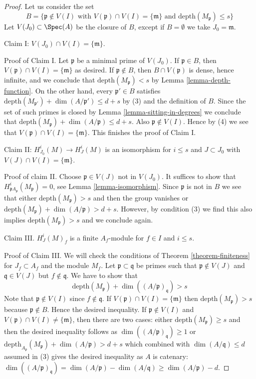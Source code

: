\begin{proof}
Let us consider the set
$$
B = \{\mathfrak p \not \in V(I) \text{ with }
V(\mathfrak p) \cap V(I) = \{\mathfrak m\} \text{ and }
\text{depth}(M_\mathfrak p) \leq s\}
$$
Let $V(J_0) \subset \Spec(A)$ be the closure of $B$, except
if $B = \emptyset$ we take $J_0 = \mathfrak m$.

\medskip\noindent
Claim I: $V(J_0) \cap V(I) = \{\mathfrak m\}$.

\medskip\noindent
Proof of Claim I. Let $\mathfrak p$ be a minimal prime of $V(J_0)$.
If $\mathfrak p \in B$, then $V(\mathfrak p) \cap V(I) = \{\mathfrak m\}$
as desired. If $\mathfrak p \not \in B$, then
$B \cap V(\mathfrak p)$ is dense, hence infinite, and we conclude that
$\text{depth}(M_\mathfrak p) < s$ by Lemma \ref{lemma-depth-function}.
On the other hand, every $\mathfrak p' \in B$ satisfies
$\text{depth}(M_{\mathfrak p'}) + \dim(A/\mathfrak p') \leq d + s$
by (3) and the definition of $B$. Since the set of such primes is
closed by Lemma \ref{lemma-sitting-in-degrees} we conclude that
$\text{depth}(M_\mathfrak p) + \dim(A/\mathfrak p) \leq d + s$.
Also $\mathfrak p \not \in V(I)$. Hence by (4) we see that
$V(\mathfrak p) \cap V(I) = \{\mathfrak m\}$. This finishes the
proof of Claim I.

\medskip\noindent
Claim II: $H^i_{J_0}(M) \to H^i_J(M)$ is an isomorphism for $i \leq s$
and $J \subset J_0$ with $V(J) \cap V(I) = \{\mathfrak m\}$.

\medskip\noindent
Proof of claim II. Choose $\mathfrak p \in V(J)$ not in $V(J_0)$.
It suffices to show that
$H^i_{\mathfrak pA_\mathfrak p}(M_\mathfrak p) = 0$, see
Lemma \ref{lemma-isomorphism}.
Since $\mathfrak p$ is not in $B$ we see that either
$\text{depth}(M_\mathfrak p) > s$ and then the group
vanishes or $\text{depth}(M_\mathfrak p) + \dim(A/\mathfrak p) > d + s$.
However, by condition (3) we find this also implies
$\text{depth}(M_\mathfrak p) > s$ and we conclude again.

\medskip\noindent
Claim III. $H^i_J(M)_f$ is a finite $A_f$-module for
$f \in I$ and $i \leq s$.

\medskip\noindent
Proof of Claim III. We will check the conditions of
Theorem \ref{theorem-finiteness} for $J_f \subset A_f$ and
the module $M_f$. Let $\mathfrak p \subset \mathfrak q$ be primes
such that $\mathfrak p \not \in V(J)$ and
$\mathfrak q \in V(J)$ but $f \not \in \mathfrak q$. We have to show that
$$
\text{depth}(M_\mathfrak p) + \dim((A/\mathfrak p)_\mathfrak q) > s
$$
Note that $\mathfrak p \not \in V(I)$ since $f \not \in \mathfrak q$.
If $V(\mathfrak p) \cap V(I) = \{\mathfrak m\}$
then $\text{depth}(M_\mathfrak p) > s$ because
$\mathfrak p \not \in B$. Hence the desired inequality.
If $\mathfrak p \not \in V(I)$ and
$V(\mathfrak p) \cap V(I) \not = \{\mathfrak m\}$, then
there are two cases: either $\text{depth}(M_\mathfrak p) \geq s$
and then the desired inequality follows as
$\dim((A/\mathfrak p)_\mathfrak q) \geq 1$ or
$\text{depth}_{A_\mathfrak p}(M_\mathfrak p) + \dim(A/\mathfrak p) > d + s$
which combined with $\dim(A/\mathfrak q) \leq d$ assumed in (3)
gives the desired inequality as $A$ is catenary:
$\dim((A/\mathfrak p)_\mathfrak q) = \dim(A/\mathfrak p) - \dim(A/\mathfrak q)
\geq \dim(A/\mathfrak p) - d$.


\end{proof}
